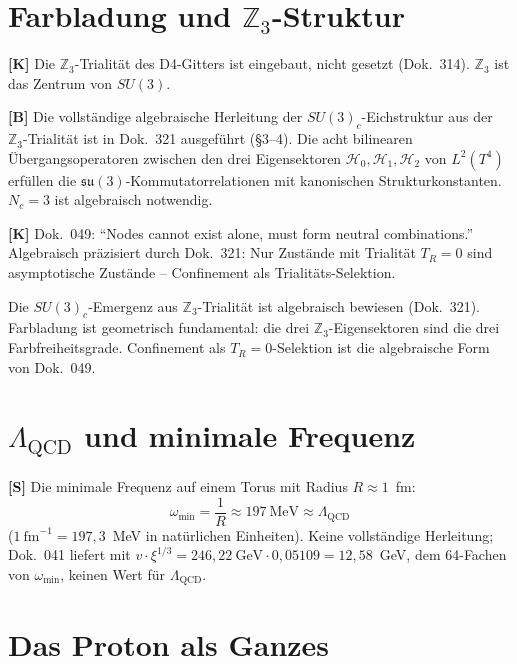 \section{Farbladung und $\mathbb{Z}_3$-Struktur}

\textbf{[K]} Die $\mathbb{Z}_3$-Trialität des D4-Gitters ist
eingebaut, nicht gesetzt (Dok.~314). $\mathbb{Z}_3$ ist das Zentrum
von $SU(3)$.

\textbf{[B]} Die vollst\"{a}ndige algebraische Herleitung der
$SU(3)_c$-Eichstruktur aus der $\mathbb{Z}_3$-Trialit\"{a}t ist in
Dok.~321 ausgef\"{u}hrt (\S3--4). Die acht bilinearen
\"{U}bergangsoperatoren zwischen den drei Eigensektoren
$\mathcal{H}_0, \mathcal{H}_1, \mathcal{H}_2$ von $L^2(T^4)$
erf\"{u}llen die $\mathfrak{su}(3)$-Kommutatorrelationen mit
kanonischen Strukturkonstanten. $N_c = 3$ ist algebraisch notwendig.

\textbf{[K]} Dok.~049: ``Nodes cannot exist alone, must form neutral
combinations.'' Algebraisch pr\"{a}zisiert durch Dok.~321:
Nur Zust\"{a}nde mit Trialit\"{a}t $T_R = 0$ sind asymptotische
Zust\"{a}nde -- Confinement als Trialit\"{a}ts-Selektion.

\begin{tcolorbox}[colback=green!6!white,colframe=green!50!black,
  title=Status der Farbladungs-These -- geschlossen durch Dok.~321 \textbf{[B]}]
Die $SU(3)_c$-Emergenz aus $\mathbb{Z}_3$-Trialit\"{a}t ist
algebraisch bewiesen (Dok.~321). Farbladung ist geometrisch fundamental:
die drei $\mathbb{Z}_3$-Eigensektoren sind die drei Farbfreiheitsgrade.
Confinement als $T_R=0$-Selektion ist die algebraische Form
von Dok.~049.
\end{tcolorbox}

\section{$\Lambda_{\text{QCD}}$ und minimale Frequenz}

\textbf{[S]} Die minimale Frequenz auf einem Torus mit Radius
$R \approx 1$~fm:
\begin{equation}
  \omega_{\min} = \frac{1}{R} \approx 197~\text{MeV}
  \approx \Lambda_{\text{QCD}}
\end{equation}
($1~\text{fm}^{-1} = 197{,}3$~MeV in natürlichen Einheiten).
Keine vollständige Herleitung; Dok.~041 liefert mit
$v\cdot\xi^{1/3} = 246{,}22~\text{GeV}\cdot 0{,}05109 = 12{,}58$~GeV, dem
64-Fachen von $\omega_{\min}$, keinen Wert für $\Lambda_{\text{QCD}}$.

\section{Das Proton als Ganzes}

